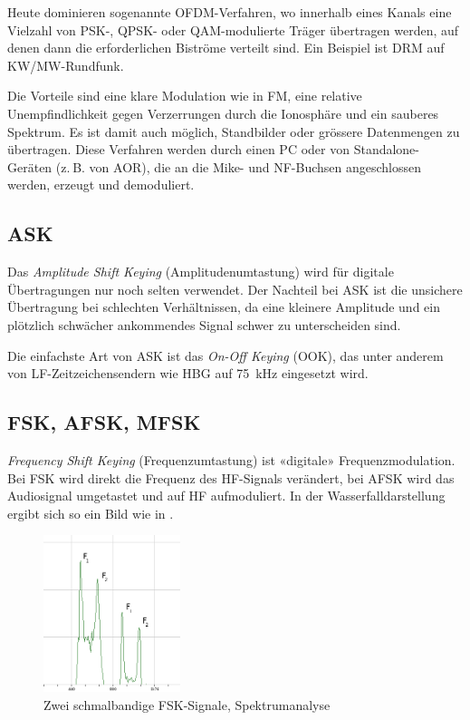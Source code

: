Heute dominieren sogenannte OFDM-Verfahren, wo innerhalb eines Kanals eine Vielzahl von PSK-, QPSK- oder QAM-modulierte Träger übertragen werden, auf denen dann die erforderlichen Biströme verteilt sind. Ein Beispiel ist DRM auf KW/MW-Rundfunk. 

Die Vorteile sind eine klare Modulation wie in FM, eine relative Unempfindlichkeit gegen Verzerrungen durch die Ionosphäre und ein sauberes Spektrum. Es ist damit auch möglich, Standbilder oder grössere Datenmengen zu übertragen. Diese Verfahren werden durch einen PC oder von Standalone-Geräten (z. B. von AOR), die an die Mike- und NF-Buchsen angeschlossen werden, erzeugt und demoduliert.

\subsection{ASK}
Das \textit{Amplitude Shift Keying} (Amplitudenumtastung) wird für digitale Übertragungen nur noch selten verwendet. Der Nachteil bei ASK ist die unsichere Übertragung bei schlechten Verhältnissen, da eine kleinere Amplitude und ein plötzlich schwächer ankommendes Signal schwer zu unterscheiden sind. 

Die einfachste Art von ASK ist das \textit{On-Off Keying} (OOK), das unter anderem von LF-Zeitzeichensendern wie HBG auf 75 kHz eingesetzt wird.

\subsection{FSK, AFSK, MFSK}
\textit{Frequency Shift Keying} (Frequenzumtastung) ist «digitale» Frequenzmodulation. Bei FSK wird direkt die Frequenz des HF-Signals verändert, bei AFSK wird das Audiosignal umgetastet und auf HF aufmoduliert. In der Wasserfalldarstellung ergibt sich so ein Bild wie in .

\begin{figure}[h!]
 \centering
 \includegraphics[width=4cm]{./png/FSK-Analysis.png}
 \caption{Zwei schmalbandige FSK-Signale, Spektrumanalyse}
 \label{fig:fsk}
\end{figure}

